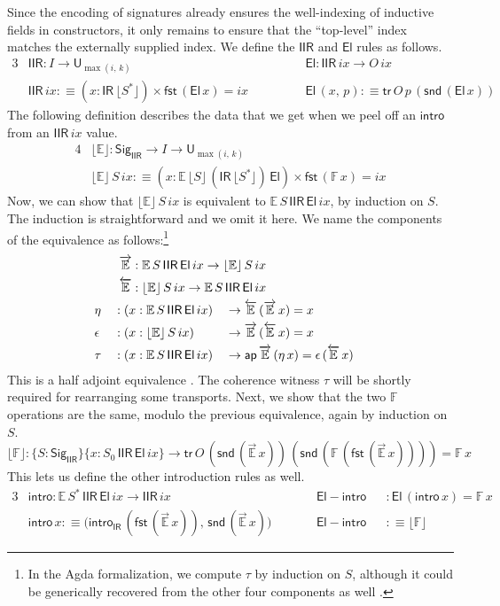 \documentclass[acmsmall,screen,review]{acmart}
\newcommand{\msf}[1]{{\mathsf{#1}}}
\newcommand{\mbb}[1]{\mathbb{#1}}
\newcommand{\U}{\msf{U}}
\newcommand{\El}{\msf{El}}
\newcommand{\Sig}{\msf{Sig}}
\newcommand{\ix}{{ix}}
\newcommand{\IR}{\msf{IR}}
\newcommand{\intro}{\msf{intro}}
\newcommand{\tr}{\msf{tr}}
\newcommand{\fst}{\msf{fst}}
\newcommand{\snd}{\msf{snd}}
\newcommand{\IIR}{\msf{IIR}}
\newcommand{\Sigr}[1]{\lfloor #1 \rfloor}
\newcommand{\floord}[1]{\lfloor #1 \rfloor}
\newcommand{\ora}[1]{\overrightarrow{#1}}
\newcommand{\ola}[1]{\overleftarrow{#1}}
\newcommand{\ap}{\msf{ap}}
\newcommand{\E}{\mbb{E}}
\newcommand{\F}{\mbb{F}}
\begin{document}
Since the encoding of signatures already ensures the well-indexing of inductive fields in
constructors, it only remains to ensure that the ``top-level'' index matches the externally supplied
index. We define the $\IIR$ and $\El$ rules as follows.
\begin{alignat*}{3}
  &\IIR : I \to \U_{\max(i,\,k)}                         && \El : \IIR\,\ix \to O\,\ix \\
  &\IIR\,\ix :\equiv (x : \IR\,\Sigr{S^*}) \times \fst\,(\El\,x) = \ix \hspace{3em}&& \El\,(x,\,p) :\equiv \tr\,O\,p\,(\snd\,(\El\,x))
\end{alignat*}
The following definition describes the data that we get when we peel off an $\intro$ from an
$\IIR\,\ix$ value.
\begin{alignat*}{4}
  &\floord{\E} : \Sig_\IIR \to I \to \U_{\max(i,\,k)}\\
  &\floord{\E}\,S\,\ix :\equiv (x : \E\,\floord{S}\,(\IR\,\floord{S^*})\,\El) \times \fst\,(\F\,x) = \ix
\end{alignat*}
Now, we can show that $\floord{\E}\,S\,\ix$ is equivalent to $\E\,S\,\IIR\,\El\,\ix$, by induction on
$S$. The induction is straightforward and we omit it here. We name the components of the equivalence
as follows:\footnote{In the Agda formalization, we compute $\tau$ by induction on $S$, although it
could be generically recovered from the other four components as well \cite[Section~4.2]{hottbook}.}
\begin{alignat*}{4}
  &\rlap{$\hspace{2em}\ora{\E} : \E\,S\,\IIR\,\El\,\ix \to \floord{\E}\,S\,\ix$} \\
  &\rlap{$\hspace{2em}\ola{\E} : \floord{\E}\,S\,\ix \to \E\,S\,\IIR\,\El\,\ix$} \\
  &\eta      &&: (x : \E\,S\,\IIR\,\El\,\ix) &&\to \ola{\E}\,(\ora{\E}\,x) = x \\
  &\epsilon  &&: (x : \floord{\E}\,S\,\ix)   &&\to \ora{\E}\,(\ola{\E}\,x) = x \\
  &\tau      &&: (x : \E\,S\,\IIR\,\El\,\ix) &&\to \ap\,\ora{\E}\,(\eta\,x) = \epsilon\,(\ola{\E}\,x)
\end{alignat*}
This is a half adjoint equivalence \cite[Section~4.2]{hottbook}. The coherence witness $\tau$ will
be shortly required for rearranging some transports. Next, we show that the two $\F$ operations are
the same, modulo the previous equivalence, again by induction on $S$.
\[\floord{\F} : \{S : \Sig_\IIR\}\{x : S_0\,\IIR\,\El\,\ix\} \to \tr\,O\,(\snd\,(\ora{\E}\,x))\,(\snd\,(\F\,(\fst\,(\ora{\E}\,x)))) = \F\,x\]
This lets us define the other introduction rules as well.
\begin{alignat*}{3}
  &\intro    : \E\,S^*\,\IIR\,\El\,\ix \to \IIR\,\ix && \msf{El\!\!-\!\!intro} && : \El\,(\intro\,x) = \F\,x \\
  &\intro\,x :\equiv \big(\intro_\IR\,(\fst\,(\ora{\E}\,x)),\,\snd\,(\ora{\E}\,x)\big) \quad\quad&& \msf{El\!\!-\!\!intro} && :\equiv \floord{\F}
\end{alignat*}
\end{document}
